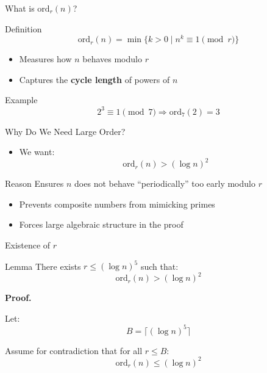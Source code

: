 \documentclass{beamer}
\begin{document}
\begin{frame}{What is $\mathrm{ord}_r(n)$?}

\begin{block}{Definition}
\[
\mathrm{ord}_r(n) = \min\{k > 0 \mid n^k \equiv 1 \pmod{r}\}
\]
\end{block}


\begin{itemize}
    \item Measures how $n$ behaves modulo $r$
    \item Captures the \textbf{cycle length} of powers of $n$
\end{itemize}


\begin{block}{Example}
\[
2^3 \equiv 1 \pmod{7} \Rightarrow \mathrm{ord}_7(2) = 3
\]
\end{block}

\end{frame}


\begin{frame}{Why Do We Need Large Order?}

\begin{itemize}
    \item We want:
\[
\mathrm{ord}_r(n) > (\log n)^2
\]
\end{itemize}


\begin{block}{Reason}
Ensures $n$ does not behave ``periodically'' too early modulo $r$
\end{block}


\begin{itemize}
    \item Prevents composite numbers from mimicking primes
    \item Forces large algebraic structure in the proof
\end{itemize}

\end{frame}



\begin{frame}{Existence of $r$}

\begin{block}{Lemma}
There exists $r \le (\log n)^5$ such that:
\[
\mathrm{ord}_r(n) > (\log n)^2
\]
\end{block}

\vspace{0.5em}

\textbf{Proof.}

Let:
\[
B = \lceil (\log n)^5 \rceil
\]

Assume for contradiction that for all $r \le B$:
\[
\mathrm{ord}_r(n) \le (\log n)^2
\]

\end{frame}
\end{document}

